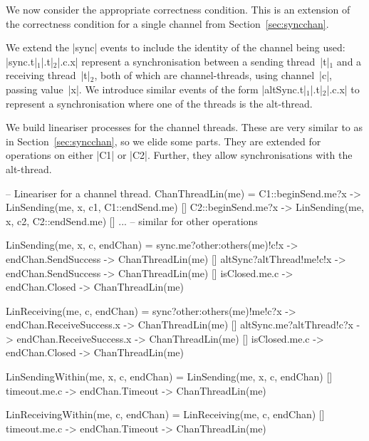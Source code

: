 
We now consider the appropriate correctness condition.   This is an extension
of the correctness condition for a single channel from
Section~\ref{sec:syncchan}. 

We extend the |sync| events to include the identity of the channel being used:
|sync.t|$_1$|.t|$_2$|.c.x| represent a synchronisation between a sending
thread~|t|$_1$ and a receiving thread~|t|$_2$, both of which are
channel-threads, using channel~|c|, passing value~|x|.
%
We introduce similar events of the form |altSync.t|$_1$|.t|$_2$|.c.x| to
represent a synchronisation where one of the threads is  the alt-thread.

We build lineariser processes for the channel threads.  These are very similar
to as in Section~\ref{sec:syncchan}, so we elide some parts.  They are
extended for operations on either |C1| or |C2|.  Further, they allow
synchronisations with the alt-thread. 
%
\begin{cspm}
-- Lineariser for a channel thread.
ChanThreadLin(me) = 
  C1::beginSend.me?x -> LinSending(me, x, c1, C1::endSend.me)
  [] C2::beginSend.me?x -> LinSending(me, x, c2, C2::endSend.me)
  [] ... -- similar for other operations 

LinSending(me, x, c, endChan) = 
  sync.me?other:others(me)!c!x -> endChan.SendSuccess -> ChanThreadLin(me)
  [] altSync?altThread!me!c!x -> endChan.SendSuccess -> ChanThreadLin(me)
  [] isClosed.me.c -> endChan.Closed -> ChanThreadLin(me)

LinReceiving(me, c, endChan) = 
  sync?other:others(me)!me!c?x -> endChan.ReceiveSuccess.x -> ChanThreadLin(me)
  [] altSync.me?altThread!c?x -> endChan.ReceiveSuccess.x -> ChanThreadLin(me)
  [] isClosed.me.c -> endChan.Closed -> ChanThreadLin(me)

LinSendingWithin(me, x, c, endChan) = 
  LinSending(me, x, c, endChan)
  [] timeout.me.c -> endChan.Timeout -> ChanThreadLin(me)

LinReceivingWithin(me, c, endChan) = 
  LinReceiving(me, c, endChan)
  [] timeout.me.c -> endChan.Timeout -> ChanThreadLin(me) 
\end{cspm}

